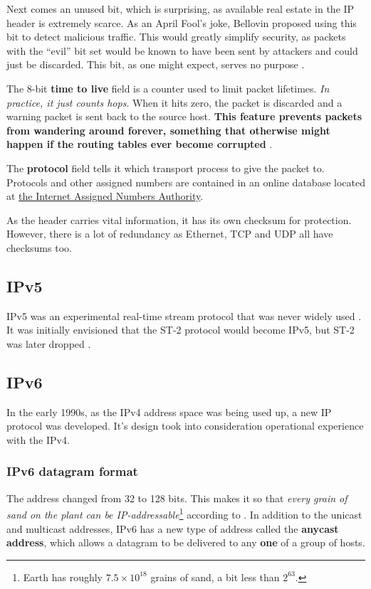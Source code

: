 Next comes an unused bit, which is surprising, as available real estate in the IP header is extremely scarce.
As an April Fool's joke, Bellovin proposed using this bit to detect malicious traffic.
This would greatly simplify security, as packets with the ``evil'' bit set would be known to have been sent by attackers and could just be discarded.
This bit, as one might expect, serves no purpose \cite{computer-networks-tanenbaum-2012}.

The 8-bit \textbf{time to live} field is a counter used to limit packet lifetimes.
\textit{In practice, it just counts hops}.
When it hits zero, the packet is discarded and a warning packet is sent back to the source host.
\textbf{This feature prevents packets from wandering around forever, something that otherwise might happen if the routing tables ever become corrupted} \cite{computer-networks-tanenbaum-2012}.

The \textbf{protocol} field tells it which transport process to give the packet to.
Protocols and other assigned numbers are contained in an online database located at \href{https://www.iana.org}{the Internet Assigned Numbers Authority}.

As the header carries vital information, it has its own checksum for protection. However, there is a lot of redundancy as Ethernet, TCP and UDP all have checksums too.

\subsection{IPv5}

IPv5 was an experimental real-time stream protocol that was never widely used \cite{communication-networks-leon-garcia-2000}.
It was initially envisioned that the ST-2 protocol would become IPv5, but ST-2 was later dropped \cite{computer-networking-kurose-2012}.

\subsection{IPv6}
In the early 1990s, as the IPv4 address space was being used up, a new IP protocol was developed.
It's design took into consideration operational experience with the IPv4.

\subsubsection{IPv6 datagram format}

The address changed from 32 to 128 bits.
This makes it so that \textit{every grain of sand on the plant can be IP-addressable}\footnote{Earth has roughly \(7.5 \times 10^{18}\) grains of sand, a bit less than \(2^{63}\).} according to \cite{computer-networking-kurose-2012}.
In addition to the unicast and multicast addresses, IPv6 has a new type of address called the \textbf{anycast address}, which allows a datagram to be delivered to any \textbf{one} of a group of hosts.

